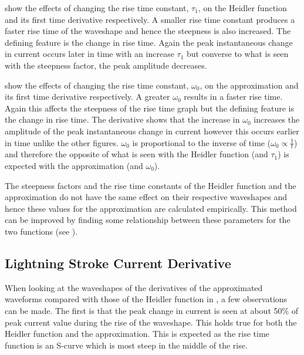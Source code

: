  show the effects of changing the rise time constant, $\tau_1$, on the Heidler function and its first time derivative respectively. A smaller rise time constant produces a faster rise time of the waveshape and hence the steepness is also increased. The defining feature is the change in rise time. Again the peak instantaneous change in current occurs later in time with an increase $\tau_1$ but converse to what is seen with the steepness factor, the peak amplitude decreases.

 show the effects of changing the rise time constant, $\omega_0$, on the approximation and its first time derivative respectively. A greater $\omega_0$ results in a faster rise time. Again this affects the steepness of the rise time graph but the defining feature is the change in rise time. The derivative shows that the increase in $\omega_0$ increases the amplitude of the peak instantaneous change in current however this occurs earlier in time unlike the other figures. $\omega_0$ is proportional to the inverse of time ($\omega_0 \propto \frac{1}{t}$) and therefore the opposite of what is seen with the Heidler function (and $\tau_1$) is expected with the approximation (and $\omega_0$).

The steepness factors and the rise time constants of the Heidler function and the approximation do not have the same effect on their respective waveshapes and hence these values for the approximation are calculated empirically. This method can be improved by finding some relationship between these parameters for the two functions (see ).

\subsection{Lightning Stroke Current Derivative}
\label{sub:discussion_stroke_current_derivative}
When looking at the waveshapes of the derivatives of the approximated waveforms compared with those of the Heidler function in , a few observations can be made. The first is that the peak change in current is seen at about 50\% of peak current value during the rise of the waveshape. This holds true for both the Heidler function and the approximation. This is expected as the rise time function is an S-curve which is most steep in the middle of the rise.


